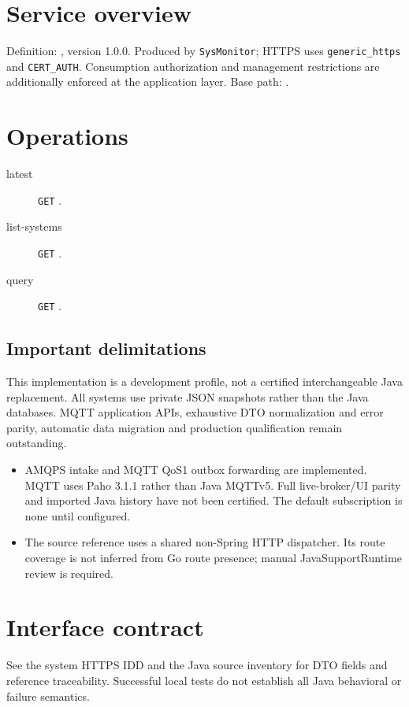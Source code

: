 \documentclass[a4paper]{arrowhead}
\begin{document}
\ArrowheadSetup
\section{Service overview}
Definition: , version 1.0.0. Produced by \texttt{SysMonitor}; HTTPS uses \texttt{generic\_https} and \texttt{CERT\_AUTH}. Consumption authorization and management restrictions are additionally enforced at the application layer. Base path: .
\section{Operations}
\begin{description}
\item[latest] \texttt{GET} .
\item[list-systems] \texttt{GET} .
\item[query] \texttt{GET} .
\end{description}
\subsection{Important delimitations}
This implementation is a development profile, not a certified interchangeable Java replacement. All systems use private JSON snapshots rather than the Java databases. MQTT application APIs, exhaustive DTO normalization and error parity, automatic data migration and production qualification remain outstanding.
\begin{itemize}
\item AMQPS intake and MQTT QoS1 outbox forwarding are implemented. MQTT uses Paho 3.1.1 rather than Java MQTTv5. Full live-broker/UI parity and imported Java history have not been certified. The default subscription is none until configured.
\item The source reference uses a shared non-Spring HTTP dispatcher. Its route coverage is not inferred from Go route presence; manual JavaSupportRuntime review is required.
\end{itemize}
\section{Interface contract}
See the system HTTPS IDD and the Java source inventory for DTO fields and reference traceability. Successful local tests do not establish all Java behavioral or failure semantics.
\end{document}
